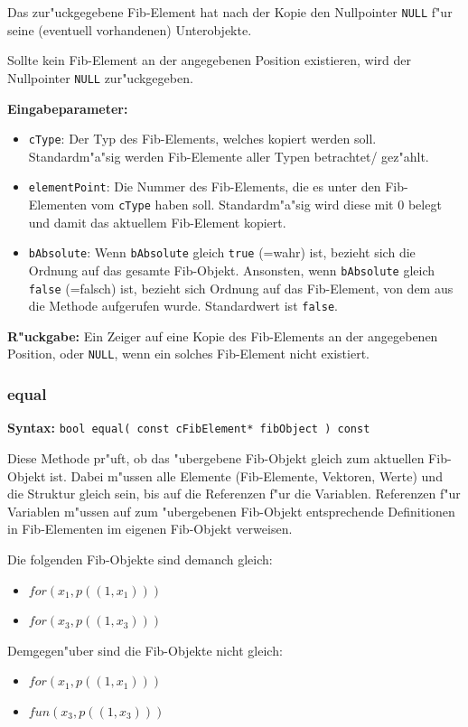 Das zur"uckgegebene Fib-Element hat nach der Kopie den Nullpointer \verb|NULL| f"ur seine (eventuell vorhandenen) Unterobjekte.

Sollte kein Fib-Element an der angegebenen Position existieren, wird der Nullpointer \verb|NULL| zur"uckgegeben.

\bigskip\noindent
\textbf{Eingabeparameter:}
\begin{itemize}
 \item \verb|cType|: Der Typ des Fib-Elements, welches kopiert werden soll. Standardm"a"sig werden Fib-Elemente aller Typen betrachtet/ gez"ahlt.
 \item \verb|elementPoint|: Die Nummer des Fib-Elements, die es unter den Fib-Elementen vom \verb|cType| haben soll. Standardm"a"sig wird diese mit $0$ belegt und damit das aktuellem Fib-Element kopiert.
 \item \verb|bAbsolute|: Wenn \verb|bAbsolute| gleich \verb|true| (=wahr) ist, bezieht sich die Ordnung auf das gesamte Fib-Objekt. Ansonsten, wenn \verb|bAbsolute| gleich \verb|false| (=falsch) ist, bezieht sich Ordnung auf das Fib-Element, von dem aus die Methode aufgerufen wurde. Standardwert ist \verb|false|.
\end{itemize}

\bigskip\noindent
\textbf{R"uckgabe:} Ein Zeiger auf eine Kopie des Fib-Elements an der angegebenen Position, oder \verb|NULL|, wenn ein solches Fib-Element nicht existiert.


\subsubsection{equal}

\textbf{Syntax:} \verb|bool equal( const cFibElement* fibObject ) const|

\bigskip\noindent
Diese Methode pr"uft, ob das "ubergebene Fib-Objekt gleich zum aktuellen Fib-Objekt ist. Dabei m"ussen alle Elemente (Fib-Elemente, Vektoren, Werte) und die Struktur gleich sein, bis auf die Referenzen f"ur die Variablen. Referenzen f"ur Variablen m"ussen auf zum "ubergebenen Fib-Objekt entsprechende Definitionen in Fib-Elementen im eigenen Fib-Objekt verweisen.

\noindent
Die folgenden Fib-Objekte sind demanch gleich:
\begin{itemize}
 \item $for( x_1, p(( 1, x_1 )) )$
 \item $for( x_3, p(( 1, x_3 )) )$
\end{itemize}
\noindent
Demgegen"uber sind die Fib-Objekte nicht gleich:
\begin{itemize}
 \item $for( x_1, p(( 1, x_1 )) )$
 \item $fun( x_3, p(( 1, x_3 )) )$
\end{itemize}

